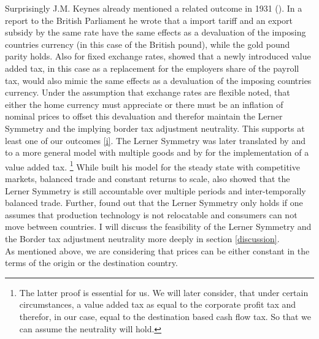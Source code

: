 Surprisingly J.M. Keynes already mentioned a related outcome in 1931 (\cite{macmillan1931report}). In a report to the British Parliament he wrote that a import tariff and an export subsidy by the same rate have the same effects as a devaluation of the imposing countries currency (in this case of the British pound), while the gold pound parity holds. Also for fixed exchange rates, \cite{farhi2013fiscal} showed that a newly introduced value added tax, in this case as a replacement for the employers share of the payroll tax, would also mimic the same effects as a devaluation of the imposing countries currency. Under the assumption that exchange rates are flexible \cite{meade1974note} noted, that either the home currency must appreciate or there must be an inflation of nominal prices to offset this devaluation and therefor maintain the Lerner Symmetry and the implying border tax adjustment neutrality. This supports at least one of our outcomes \eqref{i}. The Lerner Symmetry  was later translated by \cite{mckinnon1966intermediate} and \cite{grossman1980border} to a more general model with multiple goods and by \cite{Feldstein&Krugman} for the implementation of a value added tax. \footnote{The latter proof is essential for us. We will later consider, that under certain circumstances, a value added tax as equal to the corporate profit tax and therefor, in our case, equal to the destination based cash flow tax. So that we can assume the neutrality will hold.} While \cite{lerner1936symmetry} built his model for the steady state with competitive markets, balanced trade and constant returns to scale, \cite{Feldstein&Krugman} also showed that the Lerner Symmetry is still accountable over multiple periods and inter-temporally balanced trade. Further, \cite{costinot2017lerner} found out that the Lerner Symmetry only holds if one assumes that production technology is not relocatable and consumers can not move between countries. I will discuss the feasibility of the Lerner Symmetry and the Border tax adjustment neutrality more deeply in section \ref{discussion}.\\
As mentioned above, we are considering that prices can be either constant in the terms of the origin or the destination country.
